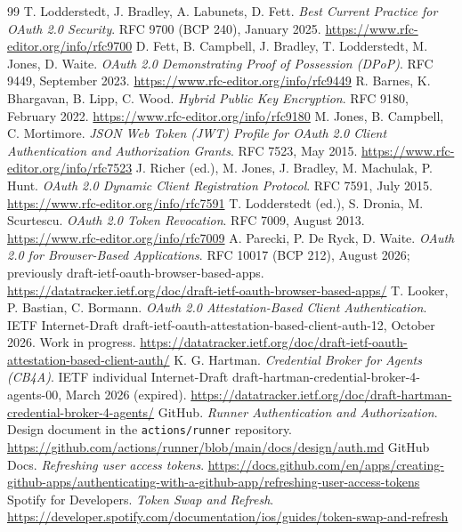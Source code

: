 \documentclass[11pt]{article}
\begin{document}
\begin{thebibliography}{99}\small
{} T. Lodderstedt, J. Bradley, A. Labunets, D. Fett. \emph{Best Current Practice for OAuth 2.0 Security}. RFC 9700 (BCP 240), January 2025. \url{https://www.rfc-editor.org/info/rfc9700}
 D. Fett, B. Campbell, J. Bradley, T. Lodderstedt, M. Jones, D. Waite. \emph{OAuth 2.0 Demonstrating Proof of Possession (DPoP)}. RFC 9449, September 2023. \url{https://www.rfc-editor.org/info/rfc9449}
 R. Barnes, K. Bhargavan, B. Lipp, C. Wood. \emph{Hybrid Public Key Encryption}. RFC 9180, February 2022. \url{https://www.rfc-editor.org/info/rfc9180}
 M. Jones, B. Campbell, C. Mortimore. \emph{JSON Web Token (JWT) Profile for OAuth 2.0 Client Authentication and Authorization Grants}. RFC 7523, May 2015. \url{https://www.rfc-editor.org/info/rfc7523}
 J. Richer (ed.), M. Jones, J. Bradley, M. Machulak, P. Hunt. \emph{OAuth 2.0 Dynamic Client Registration Protocol}. RFC 7591, July 2015. \url{https://www.rfc-editor.org/info/rfc7591}
 T. Lodderstedt (ed.), S. Dronia, M. Scurtescu. \emph{OAuth 2.0 Token Revocation}. RFC 7009, August 2013. \url{https://www.rfc-editor.org/info/rfc7009}
 A. Parecki, P. De Ryck, D. Waite. \emph{OAuth 2.0 for Browser-Based Applications}. RFC 10017 (BCP 212), August 2026; previously draft-ietf-oauth-browser-based-apps. \url{https://datatracker.ietf.org/doc/draft-ietf-oauth-browser-based-apps/}
 T. Looker, P. Bastian, C. Bormann. \emph{OAuth 2.0 Attestation-Based Client Authentication}. IETF Internet-Draft draft-ietf-oauth-attestation-based-client-auth-12, October 2026. Work in progress. \url{https://datatracker.ietf.org/doc/draft-ietf-oauth-attestation-based-client-auth/}
 K. G. Hartman. \emph{Credential Broker for Agents (CB4A)}. IETF individual Internet-Draft draft-hartman-credential-broker-4-agents-00, March 2026 (expired). \url{https://datatracker.ietf.org/doc/draft-hartman-credential-broker-4-agents/}
 GitHub. \emph{Runner Authentication and Authorization}. Design document in the \texttt{actions/runner} repository. \url{https://github.com/actions/runner/blob/main/docs/design/auth.md}
 GitHub Docs. \emph{Refreshing user access tokens}. \url{https://docs.github.com/en/apps/creating-github-apps/authenticating-with-a-github-app/refreshing-user-access-tokens}
 Spotify for Developers. \emph{Token Swap and Refresh}. \url{https://developer.spotify.com/documentation/ios/guides/token-swap-and-refresh}

\end{thebibliography}
\end{document}

